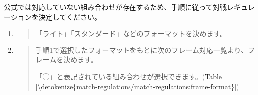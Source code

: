 \documentclass[letterpaper,10pt,dvipdfmx]{sphinxmanual}
\begin{document}
\sphinxAtStartPar
公式では対応していない組み合わせが存在するため、手順に従って対戦レギュレーションを決定してください。
\begin{enumerate}
%
\item {} 
\sphinxAtStartPar
{}
\begin{quote}

\sphinxAtStartPar
「ライト」「スタンダード」などのフォーマットを決めます。
\end{quote}

\item {} 
\sphinxAtStartPar
{}
\begin{quote}

\sphinxAtStartPar
手順1で選択したフォーマットをもとに次のフレーム対応一覧より、フレームを決めます。

\sphinxAtStartPar
「◯」と表記されている組み合わせが選択できます。(\hyperref[\detokenize{match-regulations/match-regulations:frame-format}]{Table \ref{\detokenize{match-regulations/match-regulations:frame-format}}})



\end{quote}
\end{enumerate}
\end{document}
